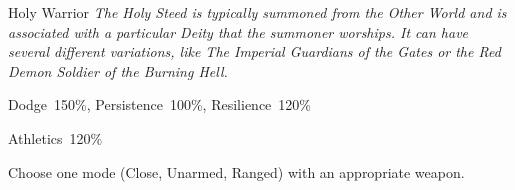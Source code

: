 \begin{monsterbox}{Holy Warrior}
	\label{monster:holy-warrior}
	\textit{The Holy Steed is typically summoned from the Other World and is associated with a particular Deity that the summoner worships. It can have several different variations, like The Imperial Guardians of the Gates or the Red Demon Soldier of the Burning Hell.}\\
	\rpghline
	\basics[%
        hitpoints  = 18,
	majorwound = 9,
	damagemodifier = +1D6,
	powerpoints = 18,
	movementrate = 12m,
	armor = Special (6AP),
	plunderrating = 0
	]
	\rpghline%
	\stats[ %
		STR = 20,
		CON = 18,
		DEX = 15,
		SIZ = 18,
		INT = 15,
		POW = 18,
		CHA = 18
	]
	\rpghline%
	\begin{rpg-monsteraction}[Resistances]
		Dodge~150\%, Persistence~100\%, Resilience~120\%
	\end{rpg-monsteraction}
	\begin{rpg-monsteraction}[Practical]
		Athletics~120\%
	\end{rpg-monsteraction}
	\begin{rpg-monsteraction}[Combat 150\%]
		Choose one mode (Close, Unarmed, Ranged) with an appropriate weapon.
	\end{rpg-monsteraction}
\end{monsterbox}

\newpage


